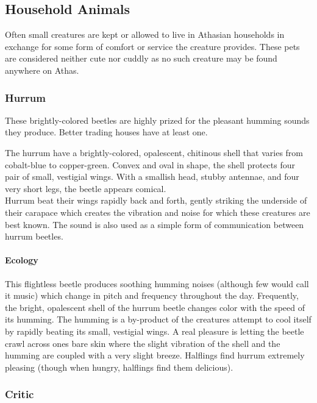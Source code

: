 \subsection{Household Animals}


Often small creatures are kept or allowed to live in Athasian
households in exchange for some form of comfort or service the
creature provides. These pets are considered neither cute nor
cuddly as no such creature may be found anywhere on Athas.

\subsubsection{Hurrum}

These brightly-colored beetles are highly prized for the pleasant
humming sounds they produce. Better trading houses have at
least one.

The hurrum have a brightly-colored, opalescent, chitinous
shell that varies from cobalt-blue to copper-green. Convex and
oval in shape, the shell protects four pair of small, vestigial
wings. With a smallish head, stubby antennae, and four very
short legs, the beetle appears comical.\\
Hurrum beat their wings rapidly back and forth, gently striking
the underside of their carapace which creates the vibration
and noise for which these creatures are best known. The sound
is also used as a simple form of communication between hurrum
beetles.

\paragraph{Ecology}
This flightless beetle produces soothing humming noises
(although few would call it music) which change in pitch and
frequency throughout the day. Frequently, the bright, opalescent
shell of the hurrum beetle changes color with the speed of its
humming. The humming is a by-product of the creatures attempt to
cool itself by rapidly beating its small, vestigial wings. A real
pleasure is letting the beetle crawl across ones bare skin where the
slight vibration of the shell and the humming are coupled with a
very slight breeze. Halflings find hurrum extremely pleasing
(though when hungry, halflings find them delicious).

\subsubsection{Critic}

